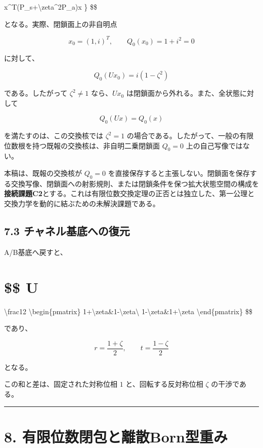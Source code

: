 \documentclass[
  a4paper,
  10pt]{article}
\begin{document}
x\^{}T(P\_s+\textbackslash zeta\^{}2P\_a)x \} \$\$

となる。実際、閉鎖面上の非自明点

\[
x_0=(1,i)^T,
\qquad
Q_0(x_0)=1+i^2=0
\]

に対して、

\[
\boxed{
Q_0(Ux_0)=i(1-\zeta^2)
}
\]

である。したがって \(\zeta^2\neq1\) なら、\(Ux_0\)
は閉鎖面から外れる。また、全状態に対して

\[
Q_0(Ux)=Q_0(x)
\]

を満たすのは、この交換核では \(\zeta^2=1\)
の場合である。したがって、一般の有限位数根を持つ既報の交換核は、非自明二乗閉鎖面
\(Q_0=0\) 上の自己写像ではない。

本稿は、既報の交換核が \(Q_0=0\)
を直接保存すると主張しない。閉鎖面を保存する交換写像、閉鎖面への射影規則、または閉鎖条件を保つ拡大状態空間の構成を\textbf{接続課題C2}とする。これは有限位数交換定理の正否とは独立した、第一公理と交換力学を動的に結ぶための未解決課題である。

\subsection{7.3
チャネル基底への復元}\label{73-ux30c1ux30e3ux30cdux30ebux57faux5e95ux3078ux306eux5fa9ux5143}

A/B基底へ戻すと、

\section{\$\$ U}\label{-u}

\textbackslash frac12 \textbackslash begin\{pmatrix\}
1+\textbackslash zeta\&1-\textbackslash zeta\textbackslash{}
1-\textbackslash zeta\&1+\textbackslash zeta
\textbackslash end\{pmatrix\} \$\$

であり、

\[
\boxed{
r=\frac{1+\zeta}{2},
\qquad
t=\frac{1-\zeta}{2}
}
\]

となる。

この和と差は、固定された対称位相 \(1\) と、回転する反対称位相 \(\zeta\)
の干渉である。

\begin{center}\rule{0.5\linewidth}{0.5pt}\end{center}

\section{8.
有限位数閉包と離散Born型重み}\label{8-ux6709ux9650ux4f4dux6570ux9589ux5305ux3068ux96e2ux6563bornux578bux91cdux307f}
\end{document}
